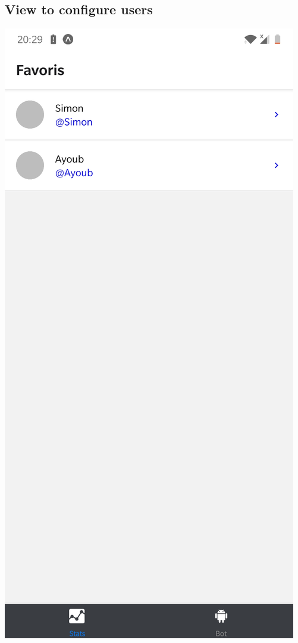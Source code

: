 \documentclass{article}
\begin{document}
\subsection{View to configure users}
\includegraphics[height=1\textheight]{users}
\end{document}

